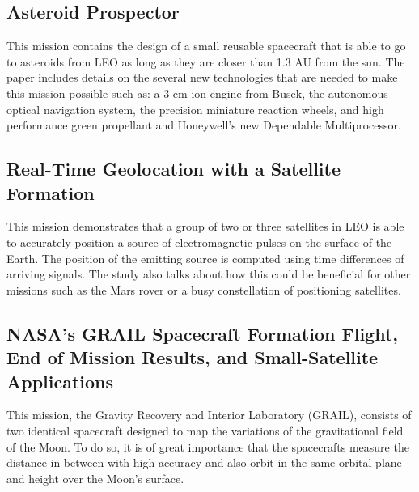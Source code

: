 \subsection{Asteroid Prospector}

This mission contains the design of a small reusable spacecraft that
is able to go to asteroids from LEO as long as they are closer than
1.3 AU from the sun. The paper includes details on the several new
technologies that are needed to make this mission possible such as:
a 3 cm ion engine from Busek, the autonomous optical navigation system,
the precision miniature reaction wheels, and high performance green
propellant and Honeywell's new Dependable Multiprocessor.\cite{Muelle_AsteroidProspector}

\subsection{Real-Time Geolocation with a Satellite Formation}

This mission demonstrates that a group of two or three satellites in
LEO is able to accurately position a source of electromagnetic pulses
on the surface of the Earth. The position of the emitting source is
computed using time differences of arriving signals. The study also
talks about how this could be beneficial for other missions such as
the Mars rover or a busy constellation of positioning satellites.\cite{Leiter_Geoloc}

\subsection{NASA\textquoteright{}s GRAIL Spacecraft Formation Flight, End of Mission Results, and Small-Satellite Applications}

This mission, the Gravity Recovery and Interior Laboratory (GRAIL),
consists of two identical spacecraft designed to map the variations
of the gravitational field of the Moon. To do so, it is of great importance
that the spacecrafts measure the distance in between with high accuracy
and also orbit in the same orbital plane and height over the Moon's
surface.\cite{Edward_GRAIL}
